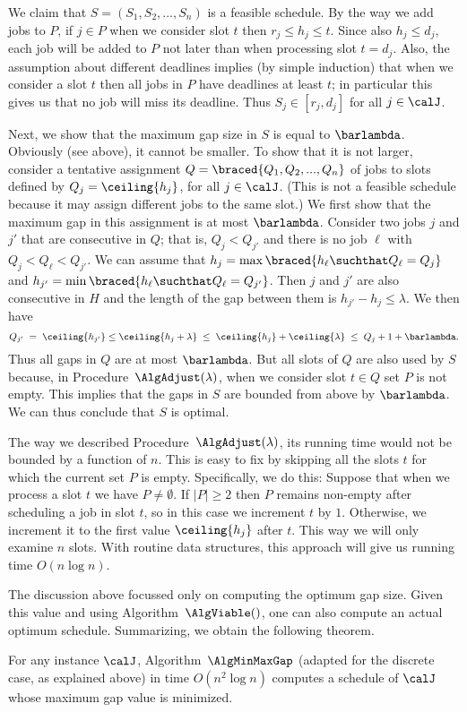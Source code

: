 We claim that $S = (S_1,S_2,...,S_n)$ is a feasible schedule. By the way we add
jobs to $P$, if $j\in P$ when we consider slot $t$ then $r_j\le h_j \le t$. Since also
$h_j \le d_j$, each job will be added to $P$ not later than when processing slot $t=d_j$.
Also, the assumption about different deadlines implies (by simple induction) that when we consider a slot $t$ then all jobs in $P$
have deadlines at least $t$; in particular this gives us that no job will miss its deadline. 
Thus $S_j \in [r_j,d_j]$ for all $j\in\calJ$.

Next, we show that the maximum gap size in $S$ is equal to $\barlambda$. Obviously (see above), it
cannot be smaller. To show that it is not larger, consider a tentative assignment $Q = \braced{Q_1,Q_2,...,Q_n}$ of jobs to
slots defined by $Q_j = \ceiling{h_j}$, for all $j\in\calJ$. (This is not a feasible schedule
because it may assign different jobs to the same slot.) We first show that the
maximum gap in this assignment is at most $\barlambda$. Consider two jobs $j$ and $j'$ that are consecutive in $Q$;
that is, $Q_j < Q_{j'}$ and there is no job $\ell$ with $Q_j < Q_\ell < Q_{j'}$.
We can assume that $h_j = \max\braced{ h_\ell \suchthat Q_\ell = Q_j}$ and
$h_{j'} = \min\braced{ h_\ell \suchthat Q_\ell = Q_{j'}}$. Then $j$ and $j'$ are also consecutive in $H$ and
the length of the gap between them is $h_{j'} - h_j \le \lambda$. We then have
\begin{equation*}
Q_{j'} \;=\; \ceiling{h_{j'}} \le \ceiling{ h_j + \lambda} 
		\;\le\; \ceiling{h_j} + \ceiling{\lambda} 
		\;\le\; Q_j + 1 + \barlambda.
\end{equation*}
Thus all gaps in $Q$ are at most $\barlambda$. But all slots of $Q$ are also used by $S$
because, in Procedure~${\AlgAdjust}(\lambda)$, when we consider slot $t\in Q$ set $P$ is not empty.
This implies that the gaps in $S$ are bounded from above by $\barlambda$. We can thus conclude that $S$ is optimal.  

The way we described Procedure~${\AlgAdjust}(\lambda)$, its running time would not be bounded by a function of $n$.
This is easy to fix by skipping all the slots $t$ for which the current set $P$ is empty. Specifically,
we do this: Suppose that when we process a slot $t$ we have $P\neq\emptyset$. If $|P|\ge 2$ then $P$ remains non-empty
after scheduling a job in slot $t$, so in this case we increment $t$ by $1$. Otherwise, we increment it to the
first value $\ceiling{h_j}$ after $t$. This way we will only examine $n$ slots.
With routine data structures, this approach will give us running time $O(n\log n)$.

The discussion above focussed only on computing the optimum gap size. Given this value
and using Algorithm~$\AlgViable()$, one can also compute an actual optimum schedule. Summarizing, we obtain the following theorem.



\begin{theorem}\label{thm: min max gap}
For any instance $\calJ$, Algorithm~$\AlgMinMaxGap$ (adapted for the discrete case, as explained above)
in time $O(n^2\log n)$ computes a schedule of $\calJ$ whose maximum gap value is minimized. 
\end{theorem}





